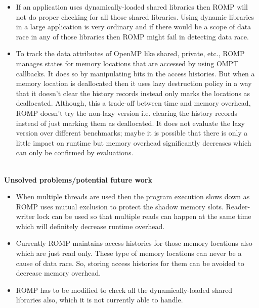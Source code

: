 \documentclass[20pt]{letter}
\begin{document}
\begin{enumerate}
{\begin{itemize}
    \item If an application uses dynamically-loaded shared libraries then ROMP will not do proper checking for all those shared libraries. Using dynamic libraries in a large application is very ordinary and if there would be a scope of data race in any of those libraries then ROMP might fail in detecting data race.\\ 

    \item To track the data attributes of OpenMP like shared, private, etc., ROMP manages states for memory locations that are accessed by using OMPT callbacks. It does so by manipulating bits in the access histories. But when a memory location is deallocated then it uses lazy destruction policy in a way that it doesn't clear the history records instead only marks the locations as deallocated. Although, this a trade-off between time and memory overhead, ROMP doesn't try the non-lazy version i.e. clearing the history records instead of just marking them as deallocated. It does not evaluate the lazy version over different benchmarks; maybe it is possible that there is only a little impact on runtime but memory overhead significantly decreases which can only be confirmed by evaluations. 
\end{itemize}

\textbf{\\Unsolved problems/potential future work}\\
\begin{itemize}
    \item When multiple threads are used then the program execution slows down as ROMP uses mutual exclusion to protect the shadow memory slots. Reader-writer lock can be used so that multiple reads can happen at the same time which will definitely decrease runtime overhead.\\

    \item Currently ROMP maintains access histories for those memory locations also which are just read only. These type of memory locations can never be a cause of data race. So, storing access histories for them can be avoided to decrease memory overhead.\\

    \item ROMP has to be modified to check all the dynamically-loaded shared libraries also, which it is not currently able to handle.
\end{itemize}
}

\end{enumerate}
\end{document}
